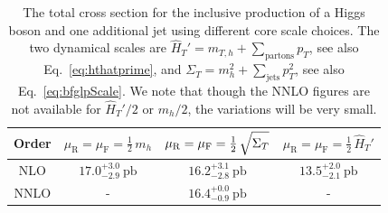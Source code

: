 \begin{table}[t!]
  \centering
  \begin{tabular}{c||c|c|c}
    Order \vphantom{$\int\limits_a^b$} &
    $\mu_\mathrm{R}=\mu_\mathrm{F}=\tfrac{1}{2}\,m_h$ &
    $\mu_\mathrm{R}=\mu_\mathrm{F}=\tfrac{1}{2}\,\sqrt{\vphantom{\big[}\Sigma_T}$ &
    $\mu_\mathrm{R}=\mu_\mathrm{F}=\tfrac{1}{2}\,\hat{H}_T'$ \\
    \hline\hline
    NLO \vphantom{$\int\limits_a^b$} &
    $17.0^{+3.0}_{-2.9}~\mathrm{pb}$ &
    $16.2^{+3.1}_{-2.8}~\mathrm{pb}$ &
    $13.5^{+2.0}_{-2.1}~\mathrm{pb}$ \\\hline
    NNLO \vphantom{$\int\limits_a^b$} & - & $16.4^{+0.0}_{-0.9}~\mathrm{pb}$ & - \\
    \hline
  \end{tabular}
  \caption{\label{tab:H1jXS}%
    The total cross section for the inclusive production of a Higgs
    boson and one additional jet using different core scale choices.
    The two dynamical scales are $\hat{H}_T'=m_{T,h}+\sum_\mathrm{partons}p_T$,
    see also Eq.~\eqref{eq:hthatprime}, and
    $\Sigma_T=m_h^2+\sum_\mathrm{jets}p_T^2$, see also
    Eq.~\eqref{eq:bfglpScale}. We note that though the NNLO figures
    are not available for $\hat{H}_T'/2$ or $m_h/2$, the variations
    will be very small.}
\end{table}

